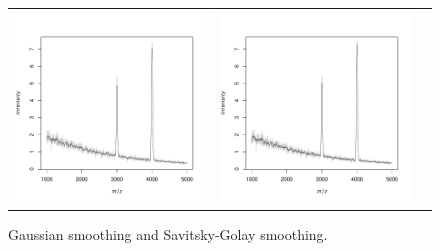 \documentclass[a4paper]{article}
\begin{document}
\begin{figure}
\begin{center}
\begin{tabular}{ccc}
\includegraphics{Cardinal-demo-043}
&
\includegraphics{Cardinal-demo-044}
\end{tabular}
\caption{\small Gaussian smoothing and Savitsky-Golay smoothing.}
\end{center}
\end{figure}
\end{document}
